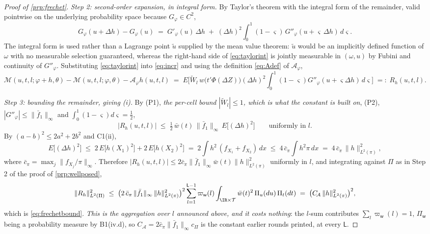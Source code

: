 \begin{proof}[Proof of \cref{prp:frechet}]
\emph{Step 2: second-order expansion, in integral form.}
By Taylor's theorem with the integral form of the remainder, valid pointwise on the underlying
probability space because $G_\varphi\in C^{2}$,
\begin{equation}\label{eq:taylorint}
G_\varphi(u+\Delta h)-G_\varphi(u)
\;=\;G'_\varphi(u)\,\Delta h\;+\;(\Delta h)^{2}\int_{0}^{1}(1-\varsigma)\,G''_\varphi(u+\varsigma\,\Delta h)\,d\varsigma .
\end{equation}
The integral form is used rather than a Lagrange point $\tilde u$ supplied by the mean value theorem:
$\tilde u$ would be an implicitly defined function of $\omega$ with no measurable selection guaranteed,
whereas the right-hand side of \eqref{eq:taylorint} is jointly measurable in $(\omega,u)$ by Fubini and
continuity of $G''_\varphi$. Substituting \eqref{eq:taylorint} into \eqref{eq:incr} and using the
definition \eqref{eq:Adef} of $\mathcal A_\varphi$,
\begin{equation}\label{eq:remdef}
\mathcal M(u,t,l;\varphi+h,\theta)-\mathcal M(u,t,l;\varphi,\theta)-\mathcal A_\varphi h(u,t,l)
\;=\;E\Big[\widetilde W_l\,w\big(t'\Phi(\Delta Z)\big)(\Delta h)^{2}\!\int_{0}^{1}\!(1-\varsigma)G''_\varphi(u+\varsigma\Delta h)\,d\varsigma\Big]
\;=:\;R_h(u,t,l).
\end{equation}

\emph{Step 3: bounding the remainder, giving (i).}
By (P1), \emph{the per-cell bound $|\widetilde W_l|\le1$, which is what the constant is built on}, 
(P2), $|G''_\varphi|\le\|\bar f_1\|_\infty$ and $\int_0^1(1-\varsigma)d\varsigma=\tfrac12$,
\[
|R_h(u,t,l)|\;\le\;\tfrac12\,\bar w(t)\,\|\bar f_1\|_\infty\,E\big[(\Delta h)^{2}\big]
\qquad\text{uniformly in }l.
\]
By $(a-b)^2\le2a^2+2b^2$ and C1(ii),
\begin{equation}\label{eq:deltahbound}
E\big[(\Delta h)^{2}\big]\;\le\;2\,E\big[h(X_1)^{2}\big]+2\,E\big[h(X_2)^{2}\big]
\;=\;2\int h^{2}\,(f_{X_1}+f_{X_2})\,dx
\;\le\;4\,\bar c_\pi\int h^{2}\pi\,dx\;=\;4\,\bar c_\pi\,\|h\|^{2}_{L^{2}(\pi)},
\end{equation}
where $\bar c_\pi=\max_j\|f_{X_j}/\pi\|_\infty$. Therefore
$|R_h(u,t,l)|\le2\bar c_\pi\|\bar f_1\|_\infty\bar w(t)\|h\|^{2}_{L^{2}(\pi)}$ uniformly in $l$, and
integrating against
$\Pi$ as in Step 2 of the proof of \cref{prp:wellposed},
\[
\|R_h\|^{2}_{L^{2}(\Pi)}\;\le\;\big(2\,\bar c_\pi\,\|\bar f_1\|_\infty\,\|h\|^{2}_{L^{2}(\pi)}\big)^{2}
\sum_{l=1}^{\mathsf L-1}\varpi_{\mathsf w}(l)\int_{\IR\times\mathcal T}\bar w(t)^{2}\,\Pi_u(du)\,\Pi_t(dt)
\;=\;\big(C_{\!\mathcal A}\,\|h\|^{2}_{L^{2}(\pi)}\big)^{2},
\]
which is \eqref{eq:frechetbound}. \emph{This is the aggregation over $l$ announced above, and it costs
nothing}: the $l$-sum contributes $\sum_l\varpi_{\mathsf w}(l)=1$, $\Pi_{\mathsf w}$ being a probability
measure by B1(iv.d), so $C_{\!\mathcal A}=2\bar c_\pi\|\bar f_1\|_\infty c_\Pi$ is the constant earlier
rounds printed, at every $\mathsf L$.


\end{proof}
